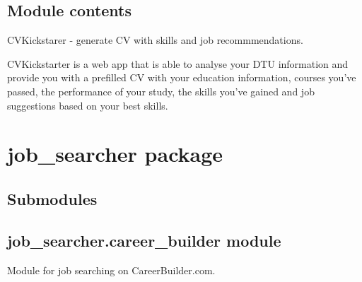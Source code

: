 \documentclass[letterpaper,10pt,english]{sphinxmanual}
\begin{document}
\section{Module contents}
\label{cv_kickstarter:module-contents}\label{cv_kickstarter:module-cv_kickstarter}
CVKickstarer - generate CV with skills and job recommmendations.

CVKickstarter is a web app that is able to analyse your DTU information
and provide you with a prefilled CV with your education information, courses
you've passed, the performance of your study, the skills you've gained and
job suggestions based on your best skills.


\chapter{job\_searcher package}
\label{job_searcher:job-searcher-package}\label{job_searcher::doc}

\section{Submodules}
\label{job_searcher:submodules}

\section{job\_searcher.career\_builder module}
\label{job_searcher:module-job_searcher.career_builder}\label{job_searcher:job-searcher-career-builder-module}
Module for job searching on CareerBuilder.com.
\end{document}
